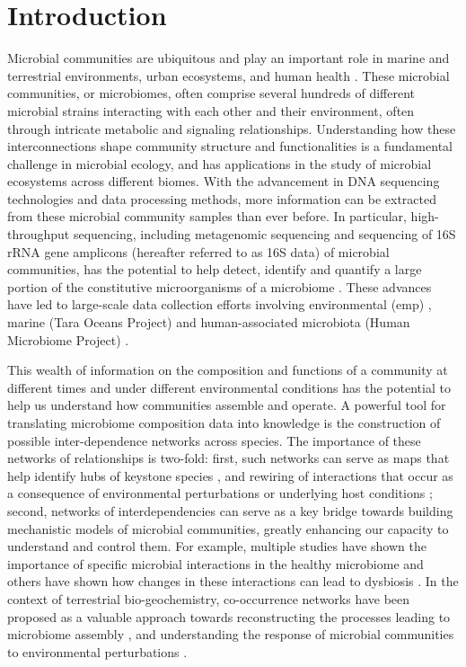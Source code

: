 
\section*{Introduction}

  Microbial communities are ubiquitous and play an important role in marine and terrestrial environments, urban ecosystems, and human health \cite{Ghoul2016,Thompson2017}.
  These microbial communities, or microbiomes, often comprise several hundreds of different microbial strains interacting with each other and their environment, often through intricate metabolic and signaling relationships.
  Understanding how these interconnections shape community structure and functionalities is a fundamental challenge in microbial ecology, and has applications in the study of microbial ecosystems across different biomes.
  With the advancement in DNA sequencing technologies \cite{Narihiro2017} and data processing methods,  more information can be extracted from these microbial community samples than ever before.
  In particular, high-throughput sequencing, including metagenomic sequencing and sequencing of 16S rRNA gene amplicons (hereafter referred to as 16S data) of microbial communities, has the potential to help detect, identify and quantify a large portion of the constitutive microorganisms of a microbiome \cite{Jovel2016,Lloyd-Price2016}.
  These advances have led to large-scale data collection efforts involving environmental (\acl{emp}) \cite{Thompson2017}, marine (Tara Oceans Project) \cite{Zhang2015} and human-associated microbiota (Human Microbiome Project) \cite{HumanMicrobiomeProjectConsortium2012}.

 This wealth of information on the composition and functions of a community at different times and under different environmental conditions has the potential to help us understand how communities assemble and operate.
 A powerful tool for translating microbiome composition data into knowledge is the construction of possible inter-dependence networks across species.
 The importance of these networks of relationships is two-fold: first, such networks can serve as maps that help identify hubs of keystone species \cite{Menon2018,Rottjers2018}, and rewiring of interactions that occur as a consequence of environmental perturbations or underlying host conditions \cite{Gilbert2016}; second, networks of interdependencies can serve as a key bridge towards building mechanistic models of microbial communities, greatly enhancing our capacity to understand and control them.
 For example, multiple studies have shown the importance of specific microbial interactions in the healthy microbiome \cite{Lloyd-Price2016} and others have shown how changes in these interactions can lead to dysbiosis \cite{Wang2017,Gilbert2016,Belizario2015}.
 In the context of terrestrial bio-geochemistry, co-occurrence networks have been proposed as a valuable approach towards reconstructing the processes leading to microbiome assembly \cite{Fierer2017}, and understanding the response of microbial communities to environmental perturbations \cite{Jiao2019}.

